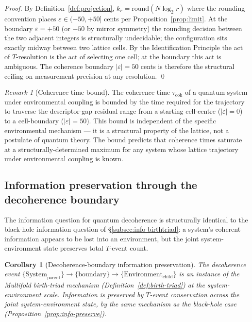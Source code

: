 \documentclass[11pt,a4paper]{article}
\newtheorem{corollary}[theorem]{Corollary}
\theoremstyle{definition}
\theoremstyle{remark}
\newtheorem{remark}[theorem]{Remark}
\begin{document}
\begin{proof}
By Definition~\ref{def:projection}, $k_{r} = \mathrm{round}(N\log_{2}r)$ where the rounding convention places $\varepsilon \in (-50, +50]$ cents per Proposition~\ref{prop:limit}. At the boundary $\varepsilon = +50$ (or $-50$ by mirror symmetry) the rounding decision between the two adjacent integers is structurally undecidable; the configuration sits exactly midway between two lattice cells. By the Identification Principle the act of $T$-resolution is the act of selecting one cell; at the boundary this act is ambiguous. The coherence boundary $|\varepsilon|=50$ cents is therefore the structural ceiling on measurement precision at any resolution. \qed
\end{proof}

\begin{remark}[Coherence time bound]\label{rem:coherence-time}
The coherence time $\tau_{\mathrm{coh}}$ of a quantum system under environmental coupling is bounded by the time required for the trajectory to traverse the descriptor-gap residual range from a starting cell-centre ($|\varepsilon| = 0$) to a cell-boundary ($|\varepsilon| = 50$). This bound is independent of the specific environmental mechanism --- it is a structural property of the lattice, not a postulate of quantum theory. The bound predicts that coherence times saturate at a structurally-determined maximum for any system whose lattice trajectory under environmental coupling is known.
\end{remark}

\subsection{Information preservation through the decoherence boundary}\label{subsec:decoherence-info}

The information question for quantum decoherence is structurally identical to the black-hole information question of \S\ref{subsec:info-birthtriad}: a system's coherent information appears to be lost into an environment, but the joint system-environment state preserves total $T$-event count.

\begin{corollary}[Decoherence-boundary information preservation]\label{cor:decoherence-info}
The decoherence event $\{\text{System}_{\text{parent}}\} \to \{\text{boundary}\} \to \{\text{Environment}_{\text{child}}\}$ is an instance of the Multifold birth-triad mechanism (Definition~\ref{def:birth-triad}) at the system-environment scale. Information is preserved by $T$-event conservation across the joint system-environment state, by the same mechanism as the black-hole case (Proposition~\ref{prop:info-preserve}).
\end{corollary}
\end{document}
